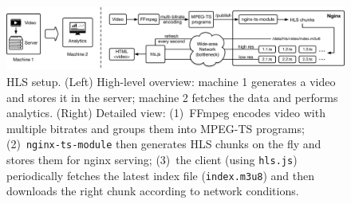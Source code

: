 \documentclass[twocolumn, 9pt]{article}
\begin{document}
\begin{figure}[!htb]
  \centering
  \includegraphics[width=\textwidth]{figures/hls-arch.pdf}
  \caption{HLS setup. (Left) High-level overview: machine 1 generates a video
    and stores it in the server; machine 2 fetches the data and performs
    analytics. (Right) Detailed view: (1)~FFmpeg encodes video with multiple
    bitrates and groups them into MPEG-TS programs; (2)~\texttt{nginx-ts-module}
    then generates HLS chunks on the fly and stores them for nginx serving;
    (3)~the client (using \texttt{hls.js}) periodically fetches the latest index
    file (\texttt{index.m3u8}) and then downloads the right chunk according to
    network conditions.}
  \label{fig:hls-arch}
\end{figure}


\end{document}
